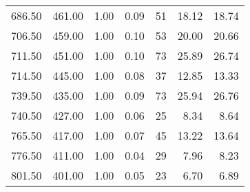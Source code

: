 \begin{table}
\begin{tabular}{rrrrrrr}
686.50 & 461.00 & 1.00 & 0.09 & 51 & 18.12 & 18.74 \\
706.50 & 459.00 & 1.00 & 0.10 & 53 & 20.00 & 20.66 \\
711.50 & 451.00 & 1.00 & 0.10 & 73 & 25.89 & 26.74 \\
714.50 & 445.00 & 1.00 & 0.08 & 37 & 12.85 & 13.33 \\
739.50 & 435.00 & 1.00 & 0.09 & 73 & 25.94 & 26.76 \\
740.50 & 427.00 & 1.00 & 0.06 & 25 & 8.34 & 8.64 \\
765.50 & 417.00 & 1.00 & 0.07 & 45 & 13.22 & 13.64 \\
776.50 & 411.00 & 1.00 & 0.04 & 29 & 7.96 & 8.23 \\
801.50 & 401.00 & 1.00 & 0.05 & 23 & 6.70 & 6.89 \\
\bottomrule
\end{tabular}
\end{table}
